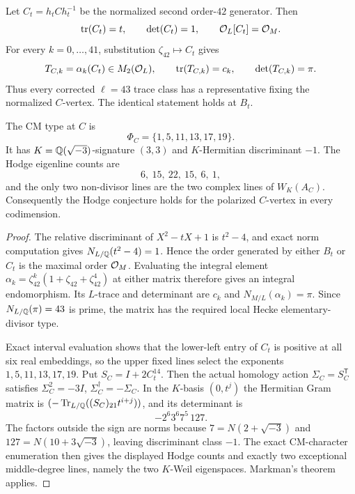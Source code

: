 \begin{proposition}\label{prop:Cvertex}
Let $C_t=h_tCh_t^{-1}$ be the normalized second order-$42$ generator.  Then
\[
 \operatorname{tr}(C_t)=t,\qquad \det(C_t)=1,\qquad \mathcal O_L[C_t]=\mathcal O_M.
\]
For every $k=0,\ldots,41$, substitution $\zeta_{42}\mapsto C_t$ gives
\[
 T_{C,k}=\alpha_k(C_t)\in M_2(\mathcal O_L),\qquad
 \operatorname{tr}(T_{C,k})=c_k,\qquad
 \det(T_{C,k})=\pi.
\]
Thus every corrected $\ell=43$ trace class has a representative fixing the
normalized $C$-vertex.  The identical statement holds at $B_t$.

The CM type at $C$ is
\[
 \Phi_C=\{1,5,11,13,17,19\}.
\]
It has $K=\mathbb Q(\sqrt{-3})$-signature $(3,3)$ and $K$-Hermitian discriminant
$-1$.  The Hodge eigenline counts are
\[
 6,\ 15,\ 22,\ 15,\ 6,\ 1,
\]
and the only two non-divisor lines are the two complex lines of $W_K(A_C)$.
Consequently the Hodge conjecture holds for the polarized $C$-vertex in every
codimension.
\end{proposition}
\begin{proof}
The relative discriminant of $X^2-tX+1$ is $t^2-4$, and exact norm
computation gives $N_{L/\mathbb Q}(t^2-4)=1$.  Hence the order generated by either
$B_t$ or $C_t$ is the maximal order $\mathcal O_M$.  Evaluating the integral element
$\alpha_k=\zeta_{42}^k(1+\zeta_{42}+\zeta_{42}^4)$ at either matrix therefore
gives an integral endomorphism.  Its $L$-trace and determinant are
$c_k$ and $N_{M/L}(\alpha_k)=\pi$.  Since $N_{L/\mathbb Q}(\pi)=43$ is prime, the
matrix has the required local Hecke elementary-divisor type.

Exact interval evaluation shows that the lower-left entry of $C_t$ is positive
at all six real embeddings, so the upper fixed lines select the exponents
$1,5,11,13,17,19$.  Put $S_C=I+2C_t^{14}$.  Then
the actual homology action $\Sigma_C=S_C^{\mathsf T}$ satisfies $\Sigma_C^2=-3I$, $\Sigma_C^\dagger=-\Sigma_C$. In the $K$-basis $(0,t^j)$ the Hermitian Gram matrix is $(-\operatorname{Tr}_{L/\mathbb Q}((S_C)_{21}t^{i+j}))$, and its determinant is
\[
 -2^6 3^6 7^5\,127.
\]
The factors outside the sign are norms because
$7=N(2+\sqrt{-3})$ and $127=N(10+3\sqrt{-3})$, leaving discriminant class
$-1$.  The exact CM-character enumeration then gives the displayed Hodge
counts and exactly two exceptional middle-degree lines, namely the two
$K$-Weil eigenspaces.  Markman's theorem applies.
\end{proof}

